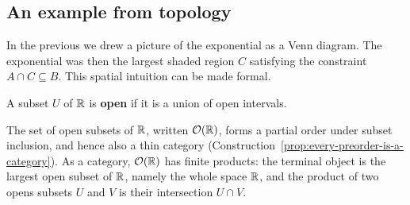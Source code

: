 
\subsection{An example from topology}

In the previous we drew a picture of the exponential as a Venn diagram.
The exponential was then the largest shaded region \(C\) satisfying
the constraint \(A \cap C \subseteq B\).
This spatial intuition can be made formal.

\begin{definition}
  A subset \(U\) of \(\mathbb R\) is \textbf{open}
  if it is a union of open intervals.
\end{definition}

The set of open subsets of \(\mathbb R\), written \(\mathcal O(\mathbb R)\),
forms a partial order under subset inclusion,
and hence also a thin category (Construction~\ref{prop:every-preorder-is-a-category}).
As a category, \(\mathcal O(\mathbb R)\) has finite products:
the terminal object is the largest open subset of \(\mathbb R\),
namely the whole space \(\mathbb R\),
and the product of two opens subsets \(U\) and \(V\)
is their intersection \(U\cap V\).

